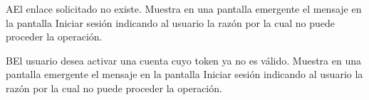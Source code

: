  \begin{UCtrayectoriaA}{A}{El enlace solicitado no existe.}
 	\UCpaso[\UCsist] Muestra en una pantalla emergente el mensaje  en la pantalla  {Iniciar sesión} indicando al usuario la razón por la cual no puede proceder la operación. 
 \end{UCtrayectoriaA}
 
 \begin{UCtrayectoriaA}{B}{El usuario desea activar una cuenta cuyo token ya no es válido.}
 	\UCpaso[\UCsist] Muestra en una pantalla emergente el mensaje  en la pantalla  {Iniciar sesión} indicando al usuario la razón por la cual no puede proceder la operación.
 \end{UCtrayectoriaA}
 

 
